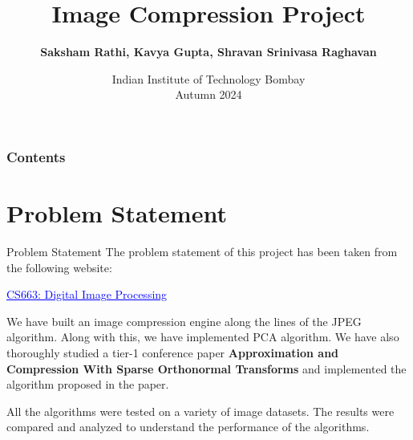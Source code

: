 \documentclass[Serif, 10pt, brown]{beamer}
\title[{Image Compression}]{\sc Image Compression Project}
\author[\ul{Authors}]{{\bf Saksham Rathi, Kavya Gupta, Shravan Srinivasa Raghavan}}
\institute[UTD]{\sc\small CS663: Digital Image Processing\\ Under Prof. Ajit Rajwade}
\date[UCI]{Indian Institute of Technology Bombay \\ Autumn 2024}
\theoremstyle{example}
\theoremstyle{plain}
\begin{document}
\frame{\titlepage}
%
%


\begin{frame}
	\transblindsvertical
	\frametitle{Contents}
	\tableofcontents[hidesubsections]
\end{frame}


\section[Problem Statement]{Problem Statement}
% 
\begin{frame}{Problem Statement}
	The problem statement of this project has been taken from the following website:
	\begin{center}
		\href{https://www.cse.iitb.ac.in/~ajitvr/CS663_Fall2024/project.html}{\textcolor{blue}{\underline{CS663: Digital Image Processing}}}
	\end{center}

	We have built an image compression engine along the lines of the JPEG algorithm. Along with this, we have implemented PCA algorithm. We have also thoroughly studied a tier-1 conference paper {\bf Approximation and Compression With Sparse Orthonormal Transforms} and implemented the algorithm proposed in the paper.
	\vspace{1cm}

	All the algorithms were tested on a variety of image datasets. The results were compared and analyzed to understand the performance of the algorithms.
\end{frame}
\end{document}

